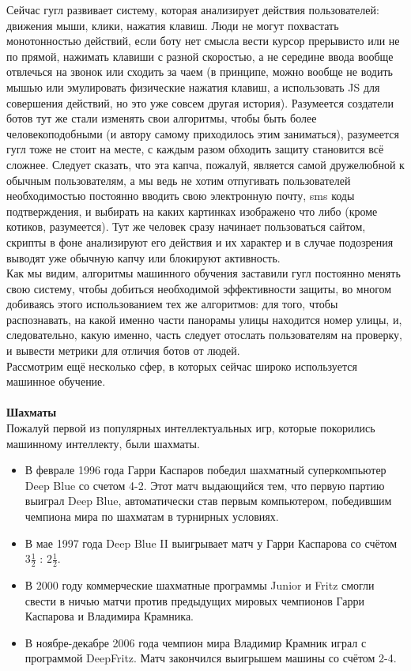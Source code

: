 Сейчас гугл развивает систему, которая анализирует действия пользователей: движения мыши, клики, нажатия клавиш. Люди не могут похвастать монотонностью действий, если боту нет смысла вести курсор прерывисто или не по прямой, нажимать клавиши с разной скоростью, а не середине ввода вообще отвлечься на звонок или сходить за чаем (в принципе, можно вообще не водить мышью или эмулировать физические нажатия клавиш, а использовать JS для совершения действий, но это уже совсем другая история). Разумеется создатели ботов тут же стали изменять свои алгоритмы, чтобы быть более человекоподобными (и автору самому приходилось этим заниматься), разумеется гугл тоже не стоит на месте, с каждым разом обходить защиту становится всё сложнее. Следует сказать, что эта капча, пожалуй, является самой дружелюбной к обычным пользователям, а мы ведь не хотим отпугивать пользователей необходимостью постоянно вводить свою электронную почту, sms коды подтверждения, и выбирать на каких картинках изображено что либо (кроме котиков, разумеется). Тут же человек сразу начинает пользоваться сайтом, скрипты в фоне анализируют его действия и их характер и в случае подозрения выводят уже обычную капчу или блокируют активность.\\

Как мы видим, алгоритмы машинного обучения заставили гугл постоянно менять свою систему, чтобы добиться необходимой эффективности защиты, во многом добиваясь этого использованием тех же алгоритмов: для того, чтобы распознавать, на какой именно части панорамы улицы находится номер улицы, и, следовательно, какую именно, часть следует отослать пользователям на проверку, и вывести метрики для отличия ботов от людей.\\

Рассмотрим ещё несколько сфер, в которых сейчас широко используется машинное обучение.\\\\

\textbf{Шахматы}\\
Пожалуй первой из популярных интеллектуальных игр, которые покорились машинному интеллекту, были шахматы.\\
\begin{itemize}
    \item В феврале 1996 года Гарри Каспаров победил шахматный суперкомпьютер Deep Blue со счетом 4-2. Этот матч выдающийся тем, что первую партию выиграл Deep Blue, автоматически став первым компьютером, победившим чемпиона мира по шахматам в турнирных условиях.
    \item В мае 1997 года Deep Blue II выигрывает матч у Гарри Каспарова со счётом $3\frac{1}{2}$ : $2\frac{1}{2}$.
    \item В 2000 году коммерческие шахматные программы Junior и Fritz смогли свести в ничью матчи против предыдущих мировых чемпионов Гарри Каспарова и Владимира Крамника.
    \item В ноябре-декабре 2006 года чемпион мира Владимир Крамник играл с программой DeepFritz. Матч закончился выигрышем машины со счётом 2-4.\\
\end{itemize}

